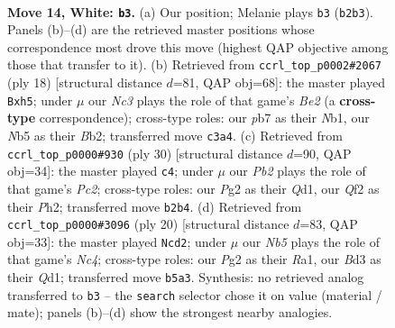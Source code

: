 \documentclass[11pt]{article}
\begin{document}
\begin{figure}[p]\centering
\begin{subfigure}{0.46\textwidth}\centering
\resizebox{\linewidth}{!}{%
\newchessgame
\chessboard[
  setfen={r2qkb1r/pp1bpp1n/n2p2p1/1N5p/4P3/2NBBP2/PPP2QPP/2K1R2R w kq - 2 14},
  showmover=false,
  pgfstyle=straightmove, color=movearrow, markmove={b2-b3}
]}
\caption{}
\end{subfigure}\hfill
\begin{subfigure}{0.46\textwidth}\centering
\resizebox{\linewidth}{!}{%
\newchessgame
\chessboard[
  setfen={rnbq1rk1/pp2ppbp/6p1/4N2n/2Pp4/1P6/PB1PBPPP/RN1Q1RK1 w - - 0 10},
  showmover=false,
  pgfstyle=straightmove, color=movearrow, markmove={e2-h5}
]}
\caption{}
\end{subfigure}
\\[4pt]
\begin{subfigure}{0.46\textwidth}\centering
\resizebox{\linewidth}{!}{%
\newchessgame
\chessboard[
  setfen={r1bqr1k1/1pppbpp1/p5np/3NP3/3B4/P4N2/1PP2PPP/R2QR1K1 w - - 2 16},
  showmover=false,
  pgfstyle=straightmove, color=movearrow, markmove={c2-c4}
]}
\caption{}
\end{subfigure}\hfill
\begin{subfigure}{0.46\textwidth}\centering
\resizebox{\linewidth}{!}{%
\newchessgame
\chessboard[
  setfen={r1b1kbnr/p1qn1ppp/8/1p2p3/2NpP3/3B1N2/PPP2PPP/R1BQ1RK1 w kq - 0 11},
  showmover=false,
  pgfstyle=straightmove, color=movearrow, markmove={c4-d2}
]}
\caption{}
\end{subfigure}
\caption{\textbf{Move 14, White: \texttt{b3}.} (a) Our position; Melanie plays \texttt{b3} (\texttt{b2b3}). Panels (b)--(d) are the retrieved master positions whose correspondence most drove this move (highest QAP objective among those that transfer to it). (b) Retrieved from \texttt{ccrl\_top\_p0002\#2067} (ply 18) [structural distance $d$=81, QAP obj=68]: the master played \texttt{Bxh5}; under $\mu$ our \emph{Nc3} plays the role of that game's \emph{Be2} (a \textbf{cross-type} correspondence); cross-type roles: our \emph{p}b7 as their \emph{N}b1, our \emph{N}b5 as their \emph{B}b2; transferred move \texttt{c3a4}. (c) Retrieved from \texttt{ccrl\_top\_p0000\#930} (ply 30) [structural distance $d$=90, QAP obj=34]: the master played \texttt{c4}; under $\mu$ our \emph{Pb2} plays the role of that game's \emph{Pc2}; cross-type roles: our \emph{P}g2 as their \emph{Q}d1, our \emph{Q}f2 as their \emph{P}h2; transferred move \texttt{b2b4}. (d) Retrieved from \texttt{ccrl\_top\_p0000\#3096} (ply 20) [structural distance $d$=83, QAP obj=33]: the master played \texttt{Ncd2}; under $\mu$ our \emph{Nb5} plays the role of that game's \emph{Nc4}; cross-type roles: our \emph{P}g2 as their \emph{R}a1, our \emph{B}d3 as their \emph{Q}d1; transferred move \texttt{b5a3}. Synthesis: no retrieved analog transferred to \texttt{b3} -- the \texttt{search} selector chose it on value (material / mate); panels (b)--(d) show the strongest nearby analogies.}
\label{fig:thought-m26}
\end{figure}
\end{document}
